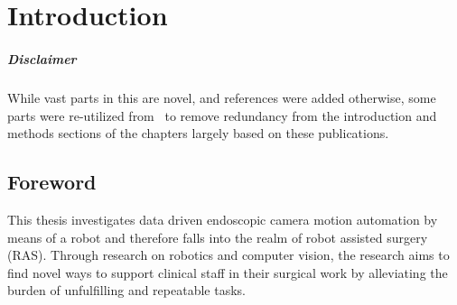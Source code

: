 \chapter[Introduction]{Introduction}
\label{chap:introduction}
\minitoc

\paragraph{Disclaimer} While vast parts in this  are novel, and references were added otherwise, some parts were re-utilized from~\cite{huber2021homographybased, huber2022deep, huber2023deep} to remove redundancy from the introduction and methods sections of the chapters largely based on these publications.

\section{Foreword}
\label{in:sec:foreword}
This thesis investigates data driven endoscopic camera motion automation by means of a robot and therefore falls into the realm of robot assisted surgery (RAS). Through research on robotics and computer vision, the research aims to find novel ways to support clinical staff in their surgical work by alleviating the burden of unfulfilling and repeatable tasks.

